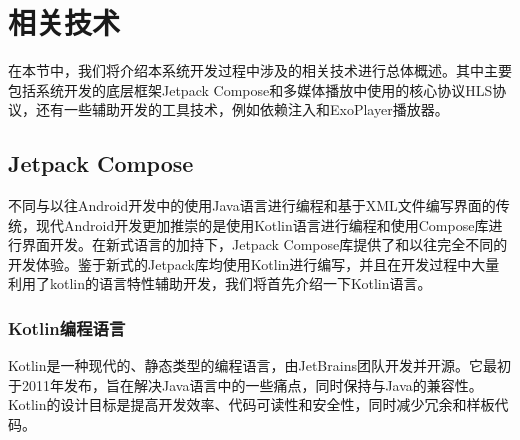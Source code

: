 \documentclass[main.tex]{subfiles}
\begin{document}
\section{相关技术}

在本节中，我们将介绍本系统开发过程中涉及的相关技术进行总体概述。其中主要包括系统开发的底层框架Jetpack Compose和多媒体播放中使用的核心协议HLS协议，还有一些辅助开发的工具技术，例如依赖注入和ExoPlayer播放器。


\subsection{Jetpack Compose}

不同与以往Android开发中的使用Java语言进行编程和基于XML文件编写界面的传统，现代Android开发更加推崇的是使用Kotlin语言进行编程和使用Compose库进行界面开发。在新式语言的加持下，Jetpack Compose库提供了和以往完全不同的开发体验。鉴于新式的Jetpack库均使用Kotlin进行编写，并且在开发过程中大量利用了kotlin的语言特性辅助开发，我们将首先介绍一下Kotlin语言。

\subsubsection{Kotlin编程语言}

Kotlin是一种现代的、静态类型的编程语言，由JetBrains团队开发并开源。它最初于2011年发布，旨在解决Java语言中的一些痛点，同时保持与Java的兼容性。Kotlin的设计目标是提高开发效率、代码可读性和安全性，同时减少冗余和样板代码。\cite{kotlin_docs}
\end{document}
